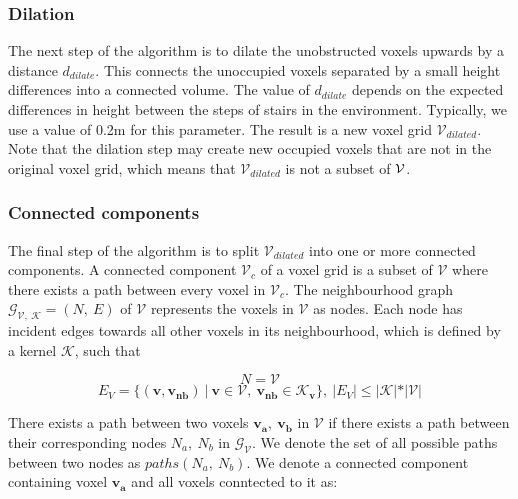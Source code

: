 \subsubsection{Dilation}
The next step of the algorithm is to dilate the unobstructed voxels upwards by a distance \(d_{dilate}\). This connects the unoccupied voxels separated by a small height differences into a connected volume. The value of \(d_{dilate}\) depends on the expected differences in height between the steps of stairs in the environment. Typically, we use a value of 0.2m for this parameter. The result is a new voxel grid \(\mathcal{V}_{dilated}\). Note that the dilation step may create new occupied voxels that are not in the original voxel grid, which means that \(\mathcal{V}_{dilated}\) is not a subset of \(\mathcal{V}\).

\subsubsection{Connected components}
The final step of the algorithm is to split \(\mathcal{V}_{dilated}\) into one or more connected components. A connected component \(\mathcal{V}_c\) of a voxel grid is a subset of \(\mathcal{V}\) where there exists a path between every voxel in \(\mathcal{V}_c\). The neighbourhood graph \(\mathcal{G}_{\mathcal{V},\ \mathcal{K}} = (N,\ E)\) of \(\mathcal{V}\) represents the voxels in \(\mathcal{V}\) as nodes. Each node has incident edges towards all other voxels in its neighbourhood, which is defined by a kernel \(\mathcal{K}\), such that 

\begin{equation}
    \label{eq:connected_components_01}
N = \mathcal{V}
\end{equation}
\begin{equation}
    \label{eq:connected_components_02}
    E_{V} = \{(\boldsymbol{v}, \boldsymbol{v_{nb}})\ |\ \boldsymbol{v} \in \mathcal{V},\ \boldsymbol{v_{nb}} \in \mathcal{K}_{\boldsymbol{v}}\},\ |E_{V}| \leq |\mathcal{K}|*|\mathcal{V}|
\end{equation}

There exists a path between two voxels \(\boldsymbol{v_a},\ \boldsymbol{v_b}\) in \(\mathcal{V}\) if there exists a path between their corresponding nodes \(N_a,\ N_b\) in \(\mathcal{G}_{\mathcal{V}}\). We denote the set of all possible paths between two nodes as \(paths(N_a,\ N_b)\). We denote a connected component containing voxel \(\boldsymbol{v_a}\) and all voxels conntected to it as:


